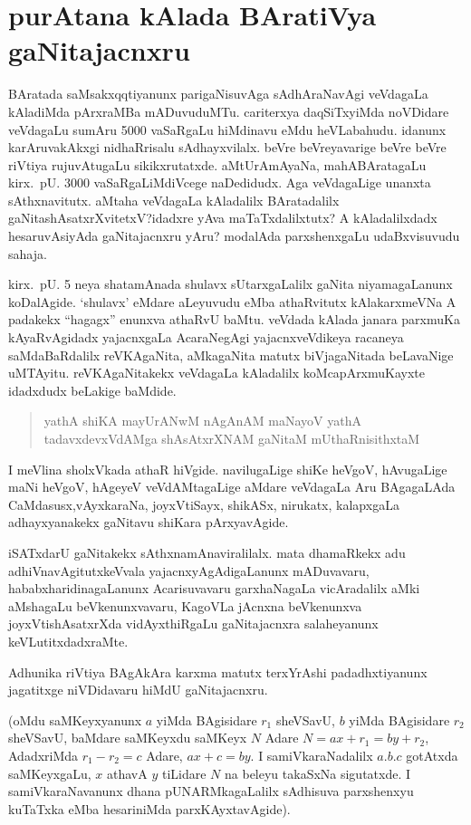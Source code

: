 \chapter{purAtana kAlada BAratiVya gaNitajacnxru}

 BAratada saMsakxqqtiyanunx parigaNisuvAga sAdhAraNavAgi veVdagaLa kAladiMda pArxraMBa mADuvuduMTu. cariterxya daqSiTxyiMda noVDidare veVdagaLu sumAru {\rm 5000} vaSaRgaLu hiMdinavu eMdu heVLabahudu. idanunx karAruvakAkxgi nidhaRrisalu sAdhayx\-vilalx. beVre beVreyavarige beVre beVre riVtiya rujuvAtugaLu sikikxrutatxde. aMtU\break rAmAyaNa, mahABAratagaLu kirx.~pU. {\rm 3000} vaSaRgaLiMdiVcege naDedidudx. Aga veVdagaLige unanxta sAthxnavitutx. aMtaha veVdagaLa kAladalilx BAratadalilx gaNitashAsatxrXvitetxV?\break idadxre yAva maTaTxdalilxtutx? A kAladalilxdadx hesaruvAsiyAda gaNitajacnxru yAru? modalAda parxshenxgaLu udaBxvisuvudu sahaja.

kirx.~pU. {\rm 5} neya shatamAnada shulavx sUtarxgaLalilx gaNita niyamagaLanunx koDalAgide. `shulavx' eMdare aLeyuvudu eMba athaRvitutx kAlakarxmeVNa A padakekx ``hagagx'' enunxva athaRvU baMtu. veVdada kAlada janara parxmuKa kAyaRvAgidadx yajacnxgaLa AcaraNegAgi yajacnxveVdikeya racaneya saMdaBaRdalilx reVKAgaNita, aMkagaNita matutx biVja\-gaNitada beLavaNige uMTAyitu. reVKAgaNitakekx veVdagaLa kAladalilx koMca\break pArxmuKayxte idadxdudx beLakige baMdide.
\begin{verse}
yathA shiKA mayUrANwM nAgAnAM maNayoV yathA\\
tadavxdevxVdAMga shAsAtxrXNAM gaNitaM mUthaRnisithxtaM
\end{verse}

I meVlina sholxVkada athaR hiVgide. navilugaLige shiKe heVgoV, hAvugaLige maNi heVgoV, hAgeyeV veVdAMtagaLige aMdare veVdagaLa Aru BAgagaLAda CaMdasusx,\break vAyxkaraNa, joyxVtiSayx, shikASx, nirukatx, kalapxgaLa adhayxyanakekx gaNitavu shiKara pArxyavAgide.

iSATxdarU gaNitakekx sAthxnamAnaviralilalx. mata dhamaRkekx adu adhiVnavAgitutx\break keVvala yajacnxyAgAdigaLanunx mADuvavaru, hababxharidinagaLanunx Acarisuvavaru garxhaNa\-gaLa vicAradalilx aMki aMshagaLu beVkenunxvavaru, KagoVLa jAcnxna beVkenunxva joyxVti\-shAsatxrXda vidAyxthiRgaLu gaNitajacnxra salaheyanunx keVLutitxdadxraMte.

Adhunika riVtiya BAgAkAra karxma matutx terxYrAshi padadhxtiyanunx jagatitxge niVDidavaru hiMdU gaNitajacnxru.

(oMdu saMKeyxyanunx $a$ yiMda BAgisidare $r_{1}$ sheVSavU, $b$ yiMda BAgisidare $r_{2}$ sheVSavU, baMdare saMKeyxdu saMKeyx $N$ Adare $N=ax+r_{1}=by+r_{2}$, AdadxriMda $r_{1}-r_{2}=c$ Adare, $ax+c=by$. I samiVkaraNadalilx $a. b. c$ gotAtxda saMKeyxgaLu, $x$ athavA $y$ tiLidare $N$ na beleyu takaSxNa sigutatxde. I samiVkaraNavanunx dhana pUNARMkagaLalilx sAdhisuva parxshenxyu kuTaTxka eMba hesariniMda parxKAyxtavAgide).

